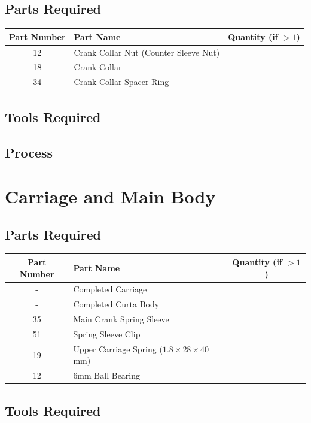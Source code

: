 \documentclass{article}
\begin{document}
\subsection{Parts Required}
\begin{table}[h!]
	\centering
	\begin{tabular}{clc}
		Part Number & Part Name & Quantity (if $>1$) \\ \hline
		 12 & Crank Collar Nut (Counter Sleeve Nut) & \\
		 18 & Crank Collar & \\
		 34 & Crank Collar Spacer Ring &\\
	\end{tabular}
\end{table}


\subsection{Tools Required}

\subsection{Process}

\newpage
\section{Carriage and Main Body}
\subsection{Parts Required}

\begin{table}[h!]
	\centering
	\begin{tabular}{clc}
		Part Number & Part Name & Quantity (if $>1$) \\ \hline
		 - & Completed Carriage & \\
		 - & Completed Curta Body & \\
		 35 & Main Crank Spring Sleeve & \\
		 51 & Spring Sleeve Clip & \\ \hline \hline
		 19 & Upper Carriage Spring ($1.8\times28\times40$mm) & \\
		 12 & 6mm Ball Bearing & 
	\end{tabular}
\end{table}


\subsection{Tools Required}
\end{document}
